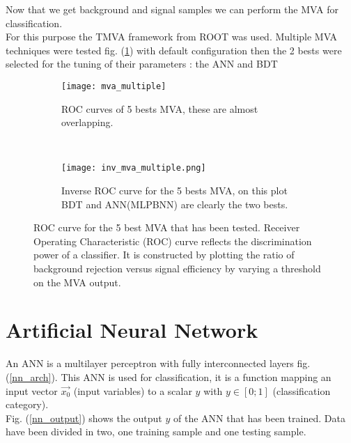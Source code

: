 \label{sec:unchapitre}

Now that we get background and signal samples we can perform the MVA for classification.\\
For this purpose the TMVA framework from ROOT was used. Multiple MVA techniques were tested fig. (\ref{mva_multiple}) with default configuration then the 2
bests were selected for the tuning of their parameters : the ANN and BDT\\

\begin{figure}[h!]
\centering
    \begin{subfigure}[h!]{0.4\textwidth}
    \centering
        \texttt{[image: mva\_multiple]}
        \caption{ROC curves of 5 bests MVA, these are almost overlapping.}
        \label{mva_multiple}
  \end{subfigure}
  ~
    \begin{subfigure}[h!]{0.4\textwidth}
    \centering
        \texttt{[image: inv\_mva\_multiple.png]}
        \caption{Inverse ROC curve for the 5 bests MVA, on this plot BDT and ANN(MLPBNN) are clearly the two bests.}
        \label{inv_mva_multiple}
  \end{subfigure}
  \caption{ROC curve for the 5 best MVA that has been tested. Receiver Operating Characteristic (ROC) curve reflects the discrimination power of a classifier. It is constructed by plotting the ratio of background rejection versus signal efficiency by varying a threshold on the MVA output.}
\end{figure}


\section{Artificial Neural Network}

An ANN is a multilayer perceptron with fully interconnected layers fig. (\ref{nn_arch}).
This ANN is used for classification, it is a function mapping an input vector $\vec{x_0}$ (input variables) to a scalar
$y$ with $y \in [0;1]$ (classification category).\\
Fig. (\ref{nn_output}) shows the output $y$ of the ANN that has been trained. Data have been divided in two, one
training sample and one testing sample.


